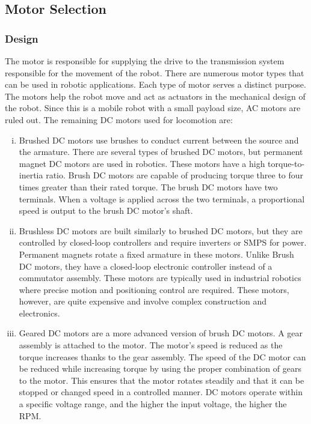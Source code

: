 \subsection{Motor Selection}
\label{sec:motor}
\subsubsection{Design}
The motor is responsible for supplying the drive to the transmission system responsible for the movement of the robot. There are numerous motor types that can be used in robotic applications. Each type of motor serves a distinct purpose. The motors help the robot move and act as actuators in the mechanical design of the robot. Since this is a mobile robot with a small payload size, \ac{AC} motors are ruled out. The remaining \ac{DC} motors used for locomotion are:
\begin{enumerate}[i.]
    \item Brushed \ac{DC} motors use brushes to conduct current between the source and the armature. There are several types of brushed \ac{DC} motors, but permanent magnet \ac{DC} motors are used in robotics. These motors have a high torque-to-inertia ratio. Brush \ac{DC} motors are capable of producing torque three to four times greater than their rated torque. The brush \ac{DC} motors have two terminals. When a voltage is applied across the two terminals, a proportional speed is output to the brush \ac{DC} motor's shaft.

    \item Brushless \ac{DC} motors are built similarly to brushed \ac{DC} motors, but they are controlled by closed-loop controllers and require inverters or \ac{SMPS} for power. Permanent magnets rotate a fixed armature in these motors. Unlike Brush \ac{DC} motors, they have a closed-loop electronic controller instead of a commutator assembly. These motors are typically used in industrial robotics where precise motion and positioning control are required. These motors, however, are quite expensive and involve complex construction and electronics.

    \item Geared \ac{DC} motors are a more advanced version of brush \ac{DC} motors. A gear assembly is attached to the motor. The motor's speed is reduced as the torque increases thanks to the gear assembly. The speed of the \ac{DC} motor can be reduced while increasing torque by using the proper combination of gears to the motor. This ensures that the motor rotates steadily and that it can be stopped or changed speed in a controlled manner. \ac{DC} motors operate within a specific voltage range, and the higher the input voltage, the higher the \ac{RPM}.
\end{enumerate}

